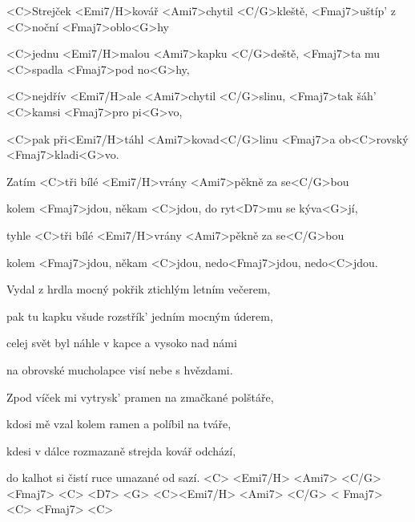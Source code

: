 

\zs
<C>Strejček <Emi7/H>kovář <Ami7>chytil <C/G>kleště, 
<Fmaj7>uštíp' z <C>noční <Fmaj7>oblo<G>hy

<C>jednu <Emi7/H>malou <Ami7>kapku <C/G>deště, 
<Fmaj7>ta mu <C>spadla <Fmaj7>pod no<G>hy,

<C>nejdřív <Emi7/H>ale <Ami7>chytil <C/G>slinu, 
<Fmaj7>tak šáh' <C>kamsi <Fmaj7>pro pi<G>vo,

<C>pak při<Emi7/H>táhl <Ami7>kovad<C/G>linu <Fmaj7>a 
ob<C>rovský <Fmaj7>kladi<G>vo.
\ks

\zr
Zatím <C>tři bílé <Emi7/H>vrány <Ami7>pěkně za se<C/G>bou

kolem <Fmaj7>jdou, někam <C>jdou, do ryt<D7>mu se 
kýva<G>jí,

tyhle <C>tři bílé <Emi7/H>vrány <Ami7>pěkně za se<C/G>bou

kolem <Fmaj7>jdou, někam <C>jdou, nedo<Fmaj7>jdou, 
nedo<C>jdou.
\kr

\zs
Vydal z hrdla mocný pokřik ztichlým letním večerem,

pak tu kapku všude rozstřík' jedním mocným úderem,

celej svět byl náhle v kapce a vysoko nad námi

na obrovské mucholapce visí nebe s hvězdami.
\ks

\zr \kr

\zs
Zpod víček mi vytrysk' pramen na zmačkané polštáře,

kdosi mě vzal kolem ramen a políbil na tváře,

kdesi v dálce rozmazaně strejda kovář odchází,

do kalhot si čistí ruce umazané od sazí.
\ks
<C> <Emi7/H> <Ami7> <C/G> <Fmaj7> <C> <D7> <G> <C><Emi7/H> <Ami7> <C/G> < Fmaj7> <C> <Fmaj7> <C>


\kp






